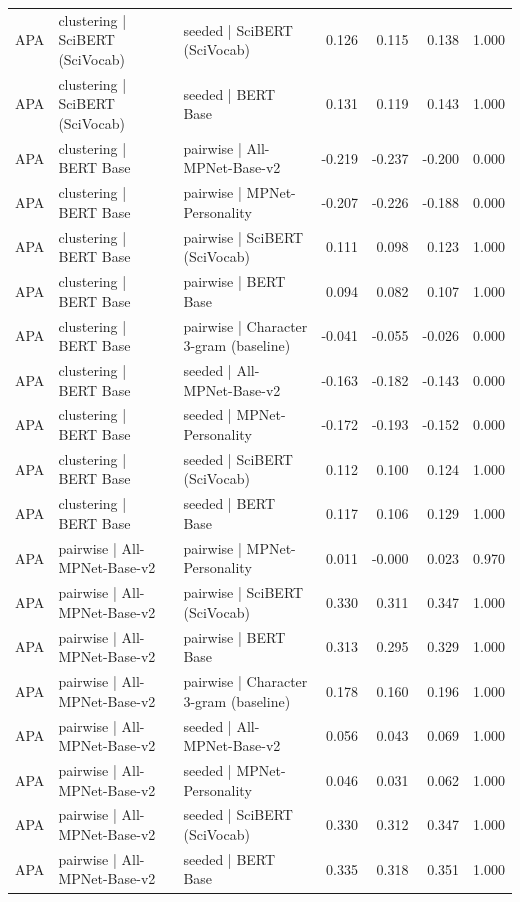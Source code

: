 \begin{table}[ht]
\begin{tabular}{lllrrrr}
APA & clustering | SciBERT (SciVocab) & seeded | SciBERT (SciVocab) & 0.126 & 0.115 & 0.138 & 1.000 \\
APA & clustering | SciBERT (SciVocab) & seeded | BERT Base & 0.131 & 0.119 & 0.143 & 1.000 \\
APA & clustering | BERT Base & pairwise | All-MPNet-Base-v2 & -0.219 & -0.237 & -0.200 & 0.000 \\
APA & clustering | BERT Base & pairwise | MPNet-Personality & -0.207 & -0.226 & -0.188 & 0.000 \\
APA & clustering | BERT Base & pairwise | SciBERT (SciVocab) & 0.111 & 0.098 & 0.123 & 1.000 \\
APA & clustering | BERT Base & pairwise | BERT Base & 0.094 & 0.082 & 0.107 & 1.000 \\
APA & clustering | BERT Base & pairwise | Character 3-gram (baseline) & -0.041 & -0.055 & -0.026 & 0.000 \\
APA & clustering | BERT Base & seeded | All-MPNet-Base-v2 & -0.163 & -0.182 & -0.143 & 0.000 \\
APA & clustering | BERT Base & seeded | MPNet-Personality & -0.172 & -0.193 & -0.152 & 0.000 \\
APA & clustering | BERT Base & seeded | SciBERT (SciVocab) & 0.112 & 0.100 & 0.124 & 1.000 \\
APA & clustering | BERT Base & seeded | BERT Base & 0.117 & 0.106 & 0.129 & 1.000 \\
APA & pairwise | All-MPNet-Base-v2 & pairwise | MPNet-Personality & 0.011 & -0.000 & 0.023 & 0.970 \\
APA & pairwise | All-MPNet-Base-v2 & pairwise | SciBERT (SciVocab) & 0.330 & 0.311 & 0.347 & 1.000 \\
APA & pairwise | All-MPNet-Base-v2 & pairwise | BERT Base & 0.313 & 0.295 & 0.329 & 1.000 \\
APA & pairwise | All-MPNet-Base-v2 & pairwise | Character 3-gram (baseline) & 0.178 & 0.160 & 0.196 & 1.000 \\
APA & pairwise | All-MPNet-Base-v2 & seeded | All-MPNet-Base-v2 & 0.056 & 0.043 & 0.069 & 1.000 \\
APA & pairwise | All-MPNet-Base-v2 & seeded | MPNet-Personality & 0.046 & 0.031 & 0.062 & 1.000 \\
APA & pairwise | All-MPNet-Base-v2 & seeded | SciBERT (SciVocab) & 0.330 & 0.312 & 0.347 & 1.000 \\
APA & pairwise | All-MPNet-Base-v2 & seeded | BERT Base & 0.335 & 0.318 & 0.351 & 1.000 \\

\end{tabular}
\end{table}
